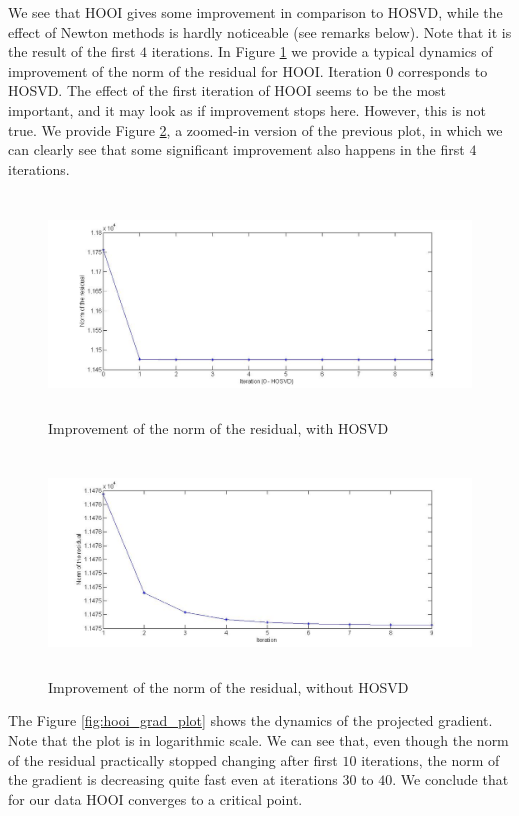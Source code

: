 We see that HOOI gives some improvement in comparison to HOSVD,
while the effect of Newton methods is hardly noticeable (see remarks below). Note that it is the result of the
first $4$ iterations. In Figure \ref{fig:hooiimprove} we provide a typical dynamics of improvement of the norm of the residual for HOOI. 
Iteration $0$ corresponds to HOSVD. The effect of the first  iteration
of HOOI seems to be the most important, and it may look as if
improvement stops here. However, this is not true. We provide Figure \ref{fig:hooiimprove1}, a zoomed-in version of the previous plot, in which
we can clearly see that some significant improvement also happens 
in the first $4$ iterations.

\begin{figure}[ht!]
\centering
        \includegraphics[height=2.3in]{images/hooi_hosvd_residual_plot}
        \caption{Improvement of the norm of the residual, with HOSVD}
    \label{fig:hooiimprove}
\end{figure}


\begin{figure}[ht!]
\centering
        \includegraphics[height=2.3in]{images/hooi_residual_plot}
        \caption{Improvement of the norm of the residual, without HOSVD}
    \label{fig:hooiimprove1}
\end{figure}


The Figure \ref{fig:hooi_grad_plot} shows the dynamics of the
projected gradient. Note that the plot is in logarithmic scale.
We can see that, even though the norm of the residual practically
stopped changing after first $10$ iterations,
the norm of the gradient is decreasing quite fast even at iterations
$30$ to $40$. We conclude that for our data HOOI converges to 
a critical point.


